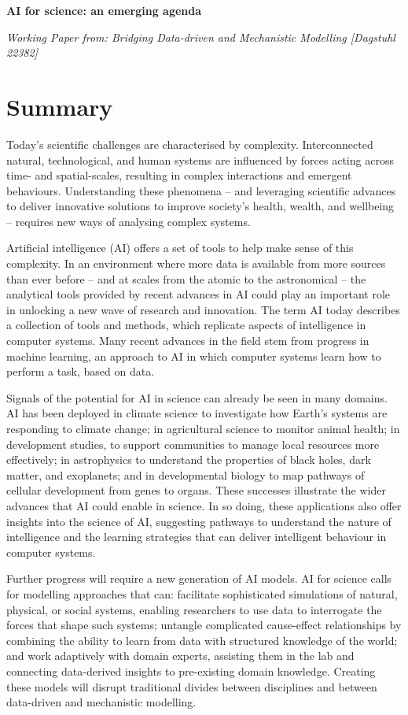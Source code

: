 \textbf{AI for science: an emerging agenda}

\emph{Working Paper from: Bridging Data-driven and Mechanistic Modelling
{[}Dagstuhl 22382{]}}

\hypertarget{summary}{%
\section{Summary}\label{summary}}

Today's scientific challenges are characterised by complexity.
Interconnected natural, technological, and human systems are influenced
by forces acting across time- and spatial-scales, resulting in complex
interactions and emergent behaviours. Understanding these phenomena --
and leveraging scientific advances to deliver innovative solutions to
improve society's health, wealth, and wellbeing -- requires new ways of
analysing complex systems.

Artificial intelligence (AI) offers a set of tools to help make sense of
this complexity. In an environment where more data is available from
more sources than ever before -- and at scales from the atomic to the
astronomical -- the analytical tools provided by recent advances in AI
could play an important role in unlocking a new wave of research and
innovation. The term AI today describes a collection of tools and
methods, which replicate aspects of intelligence in computer systems.
Many recent advances in the field stem from progress in machine
learning, an approach to AI in which computer systems learn how to
perform a task, based on data.

Signals of the potential for AI in science can already be seen in many
domains. AI has been deployed in climate science to investigate how
Earth's systems are responding to climate change; in agricultural
science to monitor animal health; in development studies, to support
communities to manage local resources more effectively; in astrophysics
to understand the properties of black holes, dark matter, and
exoplanets; and in developmental biology to map pathways of cellular
development from genes to organs. These successes illustrate the wider
advances that AI could enable in science. In so doing, these
applications also offer insights into the science of AI, suggesting
pathways to understand the nature of intelligence and the learning
strategies that can deliver intelligent behaviour in computer systems.

Further progress will require a new generation of AI models. AI for
science calls for modelling approaches that can: facilitate
sophisticated simulations of natural, physical, or social systems,
enabling researchers to use data to interrogate the forces that shape
such systems; untangle complicated cause-effect relationships by
combining the ability to learn from data with structured knowledge of
the world; and work adaptively with domain experts, assisting them in
the lab and connecting data-derived insights to pre-existing domain
knowledge. Creating these models will disrupt traditional divides
between disciplines and between data-driven and mechanistic modelling.

